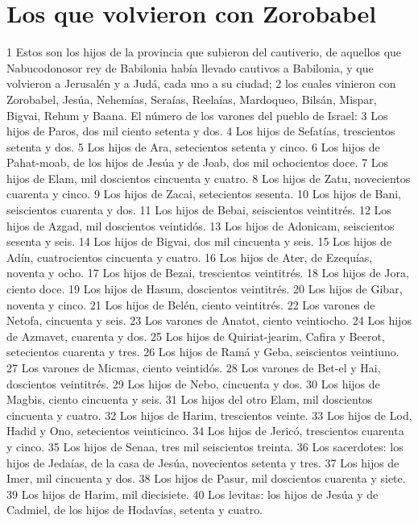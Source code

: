 \section*{Los que volvieron con Zorobabel }

1 Estos son los hijos de la provincia que subieron del cautiverio, de aquellos que Nabucodonosor rey de Babilonia había llevado cautivos a Babilonia, y que volvieron a Jerusalén y a Judá, cada uno a su ciudad;
2 los cuales vinieron con Zorobabel, Jesúa, Nehemías, Seraías, Reelaías, Mardoqueo, Bilsán, Mispar, Bigvai, Rehum y Baana. El número de los varones del pueblo de Israel:
3 Los hijos de Paros, dos mil ciento setenta y dos.
4 Los hijos de Sefatías, trescientos setenta y dos.
5 Los hijos de Ara, setecientos setenta y cinco.
6 Los hijos de Pahat-moab, de los hijos de Jesúa y de Joab, dos mil ochocientos doce.
7 Los hijos de Elam, mil doscientos cincuenta y cuatro.
8 Los hijos de Zatu, novecientos cuarenta y cinco.
9 Los hijos de Zacai, setecientos sesenta.
10 Los hijos de Bani, seiscientos cuarenta y dos.
11 Los hijos de Bebai, seiscientos veintitrés.
12 Los hijos de Azgad, mil doscientos veintidós.
13 Los hijos de Adonicam, seiscientos sesenta y seis.
14 Los hijos de Bigvai, dos mil cincuenta y seis.
15 Los hijos de Adín, cuatrocientos cincuenta y cuatro.
16 Los hijos de Ater, de Ezequías, noventa y ocho.
17 Los hijos de Bezai, trescientos veintitrés.
18 Los hijos de Jora, ciento doce.
19 Los hijos de Hasum, doscientos veintitrés.
20 Los hijos de Gibar, noventa y cinco.
21 Los hijos de Belén, ciento veintitrés.
22 Los varones de Netofa, cincuenta y seis.
23 Los varones de Anatot, ciento veintiocho.
24 Los hijos de Azmavet, cuarenta y dos.
25 Los hijos de Quiriat-jearim, Cafira y Beerot, setecientos cuarenta y tres.
26 Los hijos de Ramá y Geba, seiscientos veintiuno.
27 Los varones de Micmas, ciento veintidós.
28 Los varones de Bet-el y Hai, doscientos veintitrés.
29 Los hijos de Nebo, cincuenta y dos.
30 Los hijos de Magbis, ciento cincuenta y seis.
31 Los hijos del otro Elam, mil doscientos cincuenta y cuatro.
32 Los hijos de Harim, trescientos veinte.
33 Los hijos de Lod, Hadid y Ono, setecientos veinticinco.
34 Los hijos de Jericó, trescientos cuarenta y cinco.
35 Los hijos de Senaa, tres mil seiscientos treinta.
36 Los sacerdotes: los hijos de Jedaías, de la casa de Jesúa, novecientos setenta y tres.
37 Los hijos de Imer, mil cincuenta y dos.
38 Los hijos de Pasur, mil doscientos cuarenta y siete.
39 Los hijos de Harim, mil diecisiete.
40 Los levitas: los hijos de Jesúa y de Cadmiel, de los hijos de Hodavías, setenta y cuatro.
